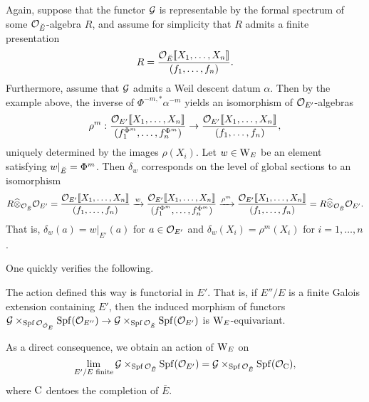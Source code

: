 \documentclass[../main.tex]{subfiles}
\begin{document}
\begin{xpl}
  Again, suppose that the functor 
  $\mathcal{G}$ is representable by the formal spectrum of some $\mathcal{O}_{{\breve {E}}}$-algebra $R$,
  and assume for simplicity that $R$ admits a finite presentation
  \begin{equation*}
    R = \frac{\mathcal{O}_{\breve {E}} \llbracket X_1, \dots, X_n\rrbracket}{(f_1, \dots, f_n)}.
  \end{equation*}
  Furthermore, assume that $\mathcal{G}$ admits a Weil descent datum $\alpha$. 
  Then by the example above, the inverse of $\Phi^{-m, *} \alpha^{-m}$
  yields an isomorphism of $\mathcal{O}_{{E'}}$-algebras
  \begin{equation*}
    \rho^m: \frac{\mathcal{O}_{{E'}} \llbracket X_1, \dots, X_n\rrbracket}{(f_1^{\Phi^m},
    \dots, f_n^{\Phi^m})} \to 
    \frac{\mathcal{O}_{{E'}} \llbracket X_1, \dots, X_n\rrbracket}{(f_1, \dots, f_n)},
  \end{equation*}
  uniquely determined by the images $\rho(X_i)$. 
  Let $w \in \mathrm W_E$ be an element satisfying $w|_{{\breve {E}}} = \Phi^{m}$.
  Then $\delta_w$ corresponds on the level of global sections to an isomorphism
  \begin{equation*}
    R \widehat \otimes_{\mathcal{O}_{\breve {E}}} \mathcal{O}_{{E'}} = 
    \frac{\mathcal{O}_{{E'}} \llbracket X_1, \dots,
    X_n\rrbracket}{(f_1, \dots, f_n)} \xrightarrow{w}  \frac{\mathcal{O}_{{E'}} \llbracket X_1, \dots,
        X_n\rrbracket}{(f_1^{\Phi^m}, \dots, f_n^{\Phi^m})} \xrightarrow{\rho^m}
        \frac{\mathcal{O}_{{E'}} \llbracket X_1, \dots, X_n\rrbracket}{(f_1, \dots, f_n)} = R
        \widehat \otimes_{\mathcal{O}_{\breve {E}}} {\mathcal{O}_{{E'}}}.
  \end{equation*}
  That is, $\delta_w(a) = w|_{E'}(a)$ for $a \in \mathcal{O}_{{E'}}$ and $\delta_w(X_i) =
  \rho^m(X_i)$ for $i= 1, \dots, n$.  
  \end{xpl}

One quickly verifies the following.

\begin{lem}\label{lem:WeilGroupActionIsFunctorialInE}
  The action defined this way is functorial in $E'$. That is, if $E''/E$ is a
  finite Galois extension containing $E'$, then the induced morphism 
  of functors 
  $\mathcal{G} \times_{\operatorname{Spf} \mathcal{O}_{{\breve {\mathcal{O}}}_E}} \operatorname{Spf}(\mathcal{O}_{E''}) \to 
  \mathcal{G} \times_{\operatorname{Spf} \mathcal{O}_{\breve {E}}} \operatorname{Spf}(\mathcal{O}_{E'})$
  is $\mathrm W_E$-equivariant. 
\end{lem}
As a direct consequence, we obtain an action of $\mathrm W_E$ on
$$\lim_{E'/E \text{ finite}} \mathcal{G} \times_{\operatorname{Spf} \mathcal{O}_{\breve {E}}} \operatorname{Spf}(\mathcal{O}_{E'}) = 
\mathcal{G} \times_{\operatorname{Spf} \mathcal{O}_{\breve {E}}} \operatorname{Spf}(\mathcal{O}_{{\mathrm{C}}}),$$ where
${\mathrm{C}}$ dentoes the completion of $\bar E$. 
\end{document}
